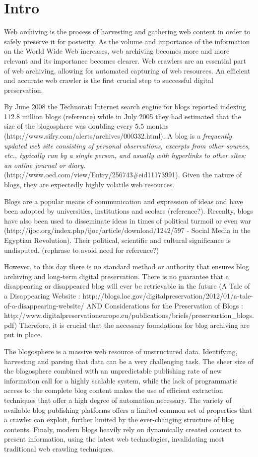 \section{Intro}

Web archiving is the process of harvesting and gathering web content in order to safely preserve it for posterity.
As the volume and importance of the information on the World Wide Web increases, web archiving becomes more and more relevant and its importance becomes clearer.
Web crawlers are an essential part of web archiving, allowing for automated capturing of web resources.
An efficient and accurate web crawler is the first crucial step to successful digital preservation.

By June 2008 the Technorati Internet search engine for blogs reported indexing 112.8 million blogs (reference) while in July 2005 they had estimated that the size of the blogosphere was doubling every 5.5 months (http://www.sifry.com/alerts/archives/000332.html).
A blog is a \emph{frequently updated web site consisting of personal observations, excerpts from other sources, etc., typically run by a single person, and usually with hyperlinks to other sites; an online journal or diary.} (http://www.oed.com/view/Entry/256743\#eid11173991).
Given the nature of blogs, they are expectedly highly volatile web resources.

Blogs are a popular means of communication and expression of ideas and have been adopted by universities, institutions and scolars (reference?).
Recenlty, blogs have also been used to disseminate ideas in times of political turmoil or even war (http://ijoc.org/index.php/ijoc/article/download/1242/597 - Social Media in the Egyptian Revolution).
Their political, scientific and cultural significance is undisputed. (rephrase to avoid need for reference?)

However, to this day there is no standard method or authority that ensures blog archiving and long-term digital preservation.
There is no guarantee that a disappearing or disappeared blog will ever be retrievable in the future (A Tale of a Disappearing Website : http://blogs.loc.gov/digitalpreservation/2012/01/a-tale-of-a-disappearing-website/ AND Considerations for the Preservation of Blogs : http://www.digitalpreservationeurope.eu/publications/briefs/preservartion\_blogs.pdf)
Therefore, it is crucial that the necessary foundations for blog archiving are put in place.

The blogosphere is a massive web resource of unstructured data.
Identifying, harvesting and parsing that data can be a very challenging task.
The sheer size of the blogosphere combined with an unpredictable publishing rate of new information call for a highly scalable system, while the lack of programmatic access to the complete blog content makes the use of efficient extraction techniques that offer a high degree of automation necessary.
The variety of available blog publishing platforms offers a limited common set of properties that a crawler can exploit, further limited by the ever-changing structure of blog contents.
Finaly, modern blogs heavily rely on dynamically created content to present information, using the latest web technologies, invalidating most traditional web crawling techniques.

